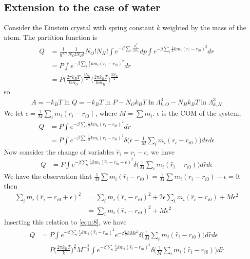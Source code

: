 \documentclass[aps,pre,a4paper,showkeys,fleqn]{revtex4}
\begin{document}
\subsection{Extension to the case of water}
Consider the Einstein crystal with spring constant $k$ weighted by the mass of the atom.
The partition function is
\begin{align*}
  Q & =
      \frac{1}{h^{3N}}
      \frac{1}{N_O!N_H!} N_O!N_H!
      \int e^{-\beta\sum_i\frac{p_i^2}{2m_i}} dp
      \int e^{-\beta\sum_i \frac 12km_i(r_i - r_{i0})^2} dr \\
    &= 
      P \int e^{-\beta\sum_i \frac 12km_i(r_i - r_{i0})^2} dr \\
    &=
      P
      \Big( \frac{2\pi k_BT}{km_O} \Big)^{\frac{3N_O}2}
      \Big( \frac{2\pi k_BT}{km_H} \Big)^{\frac{3N_H}2}
\end{align*}
so
\begin{align*}
  A = -k_BT \ln Q = -k_BT \ln P
  - N_Ok_BT\ln\Lambda_{k,O}^3
  - N_Hk_BT\ln\Lambda_{k,H}^3
\end{align*}
We let $\epsilon = \frac1M \sum_i m_i(r_i - r_{i0})$, where $M = \sum m_i$. $\epsilon$ is the COM of the system,
\begin{align*}
  Q & =
      P \int e^{-\beta\sum_i \frac 12km_i(r_i - r_{i0})^2} dr \\
    & =
      P \int e^{-\beta\sum_i \frac 12km_i(r_i - r_{i0})^2}
      \delta\big( \epsilon - \frac1M \sum_i m_i (r_i - r_{i0}) \big) dr d\epsilon 
\end{align*}
Now consider the change of variables $\hat r_i = r_i - \epsilon$, we have
\begin{align}\label{eqn:8}
  Q & =
      P \int e^{-\beta\sum_i \frac 12km_i(\hat r_i - r_{i0} + \epsilon)^2}
      \delta\big( \frac1M \sum_im_i(\hat r_i - r_{i0}) \big) d\hat r d\epsilon 
\end{align}
We have the observation that $ \frac 1M \sum m_i(\hat r_i  - r_{i0}) = \frac 1M \sum m_i( r_i  - r_{i0}) - \epsilon = 0$, then
\begin{align*}
  \sum_i m_i(\hat r_i - r_{i0} + \epsilon)^2
  &=
    \sum_i m_i(\hat r_i - r_{i0})^2 + 2\epsilon\sum_im_i (\hat r_i - r_{i0}) + M\epsilon^2 \\
  &=
    \sum_i m_i(\hat r_i - r_{i0})^2 + M\epsilon^2 
\end{align*}
Inserting this relation to \eqref{eqn:8}, we have
\begin{align}\nonumber
  Q
  & =
    P \int e^{-\beta\sum_i \frac 12km_i(\hat r_i - r_{i0})^2} e^{-\beta \frac12 kM \epsilon^2}
    \delta\big( \frac1M \sum_i m_i(\hat r_i - r_{i0}) \big) d\hat r d\epsilon \\
  &=
    P \Big( \frac{2\pi k_BT}k  \Big)^{\frac32} M^{-\frac32}
    \int e^{-\beta\sum_i \frac 12km_i(\hat r_i - r_{i0})^2}
    \delta\big( \frac1M \sum_im_i(\hat r_i - r_{i0}) \big) d\hat r
\end{align}
\end{document}
